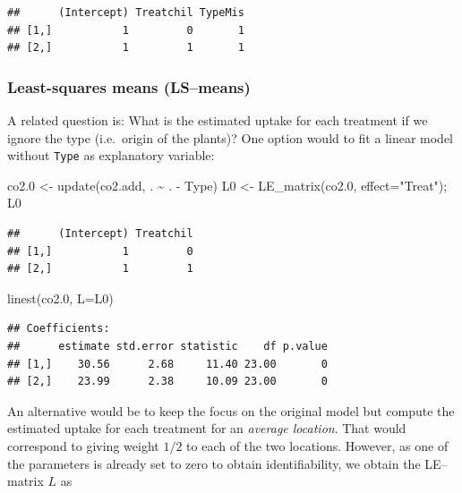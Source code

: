\documentclass[
]{article}
\newenvironment{Shaded}{\begin{snugshade}}{\end{snugshade}}
\newcommand{\AttributeTok}[1]{\textcolor[rgb]{0.77,0.63,0.00}{#1}}
\newcommand{\FloatTok}[1]{\textcolor[rgb]{0.00,0.00,0.81}{#1}}
\newcommand{\FunctionTok}[1]{\textcolor[rgb]{0.00,0.00,0.00}{#1}}
\newcommand{\NormalTok}[1]{#1}
\newcommand{\OtherTok}[1]{\textcolor[rgb]{0.56,0.35,0.01}{#1}}
\newcommand{\SpecialCharTok}[1]{\textcolor[rgb]{0.00,0.00,0.00}{#1}}
\newcommand{\StringTok}[1]{\textcolor[rgb]{0.31,0.60,0.02}{#1}}
\begin{document}
\begin{verbatim}
##      (Intercept) Treatchil TypeMis
## [1,]           1         0       1
## [2,]           1         1       1
\end{verbatim}

\hypertarget{least-squares-means-lsmeans}{%
\subsubsection{Least-squares means
(LS--means)}\label{least-squares-means-lsmeans}}

A related question is: What is the estimated uptake for each treatment
if we ignore the type (i.e.~origin of the plants)? One option would to
fit a linear model without \texttt{Type} as explanatory variable:

\begin{Shaded}
\begin{Highlighting}[]
\NormalTok{co2}\FloatTok{.0} \OtherTok{\textless{}{-}} \FunctionTok{update}\NormalTok{(co2.add, . }\SpecialCharTok{\textasciitilde{}}\NormalTok{ . }\SpecialCharTok{{-}}\NormalTok{ Type)}
\NormalTok{L0 }\OtherTok{\textless{}{-}} \FunctionTok{LE\_matrix}\NormalTok{(co2}\FloatTok{.0}\NormalTok{, }\AttributeTok{effect=}\StringTok{"Treat"}\NormalTok{); L0}
\end{Highlighting}
\end{Shaded}

\begin{verbatim}
##      (Intercept) Treatchil
## [1,]           1         0
## [2,]           1         1
\end{verbatim}

\begin{Shaded}
\begin{Highlighting}[]
\FunctionTok{linest}\NormalTok{(co2}\FloatTok{.0}\NormalTok{, }\AttributeTok{L=}\NormalTok{L0)}
\end{Highlighting}
\end{Shaded}

\begin{verbatim}
## Coefficients:
##      estimate std.error statistic    df p.value
## [1,]    30.56      2.68     11.40 23.00       0
## [2,]    23.99      2.38     10.09 23.00       0
\end{verbatim}

An alternative would be to keep the focus on the original model but
compute the estimated uptake for each treatment for an \emph{average
location}. That would correspond to giving weight \(1/2\) to each of the
two locations. However, as one of the parameters is already set to zero
to obtain identifiability, we obtain the LE--matrix \(L\) as
\end{document}
